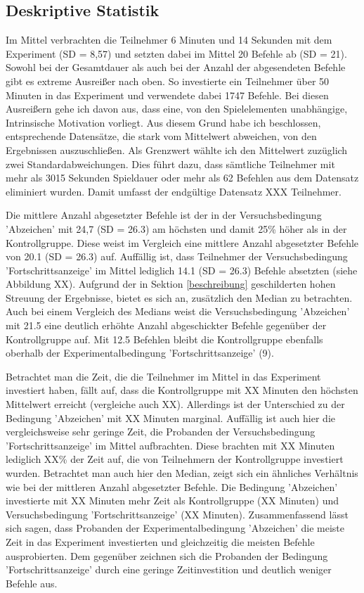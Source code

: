 \subsection{Deskriptive Statistik}
Im Mittel verbrachten die Teilnehmer 6 Minuten und 14 Sekunden mit dem Experiment (SD = 8,57) und setzten dabei im Mittel 20 Befehle ab (SD = 21). Sowohl bei der Gesamtdauer als auch bei der Anzahl der abgesendeten Befehle gibt es extreme Ausreißer nach oben. So investierte ein Teilnehmer über 50 Minuten in das Experiment und verwendete dabei 1747 Befehle. Bei diesen Ausreißern gehe ich davon aus, dass eine, von den Spielelementen unabhängige, Intrinsische Motivation vorliegt. Aus diesem Grund habe ich beschlossen, entsprechende Datensätze, die stark vom Mittelwert abweichen, von den Ergebnissen auszuschließen. Als Grenzwert wählte ich den Mittelwert zuzüglich zwei Standardabweichungen. Dies führt dazu, dass sämtliche Teilnehmer mit mehr als 3015 Sekunden Spieldauer oder mehr als 62 Befehlen aus dem Datensatz eliminiert wurden. Damit umfasst der endgültige Datensatz XXX Teilnehmer.

Die mittlere Anzahl abgesetzter Befehle ist der in der Versuchsbedingung 'Abzeichen' mit 24,7 (SD = 26.3) am höchsten und damit 25\% höher als in der Kontrollgruppe. Diese weist im Vergleich eine mittlere Anzahl abgesetzter Befehle von 20.1 (SD = 26.3) auf. Auffällig ist, dass Teilnehmer der Versuchsbedingung 'Fortschrittsanzeige' im Mittel lediglich 14.1 (SD = 26.3) Befehle absetzten (siehe Abbildung XX). Aufgrund der in Sektion \ref{beschreibung} geschilderten hohen Streuung der Ergebnisse, bietet es sich an, zusätzlich den Median zu betrachten. Auch bei einem Vergleich des Medians weist die Versuchsbedingung 'Abzeichen' mit 21.5 eine deutlich erhöhte Anzahl abgeschickter Befehle gegenüber der Kontrollgruppe auf. Mit 12.5 Befehlen bleibt die Kontrollgruppe ebenfalls oberhalb der Experimentalbedingung 'Fortschrittsanzeige' (9).

Betrachtet man die Zeit, die die Teilnehmer im Mittel in das Experiment investiert haben, fällt auf, dass die Kontrollgruppe mit XX Minuten den höchsten Mittelwert erreicht (vergleiche auch XX). Allerdings ist der Unterschied zu der Bedingung 'Abzeichen' mit XX Minuten marginal.  Auffällig ist auch hier die vergleichsweise sehr geringe Zeit, die Probanden der Versuchsbedingung 'Fortschrittsanzeige' im Mittel aufbrachten. Diese brachten mit XX Minuten lediglich XX\% der Zeit auf, die von Teilnehmern der Kontrollgruppe investiert wurden. Betrachtet man auch hier den Median, zeigt sich ein ähnliches Verhältnis wie bei der mittleren Anzahl abgesetzter Befehle. Die Bedingung 'Abzeichen' investierte mit XX Minuten mehr Zeit als Kontrollgruppe (XX Minuten) und Versuchsbedingung 'Fortschrittsanzeige' (XX Minuten). Zusammenfassend lässt sich sagen, dass Probanden der Experimentalbedingung 'Abzeichen' die meiste Zeit in das Experiment investierten und gleichzeitig die meisten Befehle ausprobierten. Dem gegenüber zeichnen sich die Probanden der Bedingung 'Fortschrittsanzeige' durch eine geringe Zeitinvestition und deutlich weniger Befehle aus.